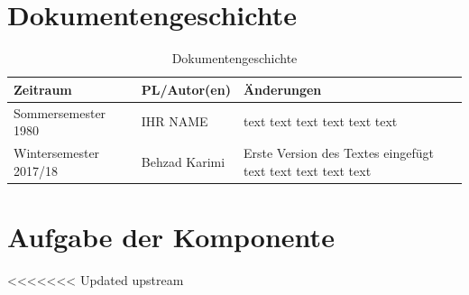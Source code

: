 \section{Dokumentengeschichte}
\begin{table}[h]
 \begin{tabular}{|l|l|p{4cm}|}
 \hline
 Zeitraum & PL/Autor(en) & Änderungen \\
 \hline
 Sommersemester 1980 & IHR NAME & 
text \newline 
text \newline 
text \newline 
text \newline 
text \newline 
text \newline 
 
  \\
 \hline
 Wintersemester 2017/18 & Behzad Karimi & 
Erste Version des Textes eingefügt\newline 
text \newline 
text \newline 
text \newline 
text \newline 
text \newline 
 
  \\
 \hline
 \end{tabular}
 \caption{Dokumentengeschichte}
 \end{table}

\section{Aufgabe der Komponente}
<<<<<<< Updated upstream



